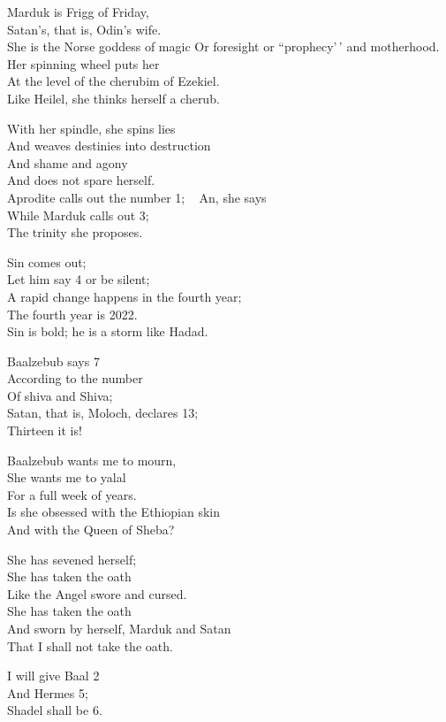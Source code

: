 \documentclass[
]{book}
\begin{document}
Marduk is Frigg of Friday,\\
Satan's, that is, Odin's wife.\\
She is the Norse goddess of magic
Or foresight or ``prophecy'\,' and motherhood.\\
Her spinning wheel puts her\\
At the level of the cherubim of Ezekiel.\\
Like Heilel, she thinks herself a cherub.

With her spindle, she spins lies\\
And weaves destinies into destruction\\
And shame and agony\\
And does not spare herself.\\
Aprodite calls out the number 1; ~
An, she says\\
While Marduk calls out 3;\\
The trinity she proposes.

Sin comes out;\\
Let him say 4 or be silent;\\
A rapid change happens in the fourth year;\\
The fourth year is 2022.\\
Sin is bold; he is a storm like Hadad.

Baalzebub says 7\\
According to the number\\
Of shiva and Shiva;\\
Satan, that is, Moloch, declares 13;\\
Thirteen it is!

Baalzebub wants me to mourn,\\
She wants me to yalal\\
For a full week of years.\\
Is she obsessed with the Ethiopian skin\\
And with the Queen of Sheba?

She has sevened herself;\\
She has taken the oath\\
Like the Angel swore and cursed.\\
She has taken the oath\\
And sworn by herself, Marduk and Satan\\
That I shall not take the oath.

I will give Baal 2\\
And Hermes 5;\\
Shadel shall be 6.
\end{document}
